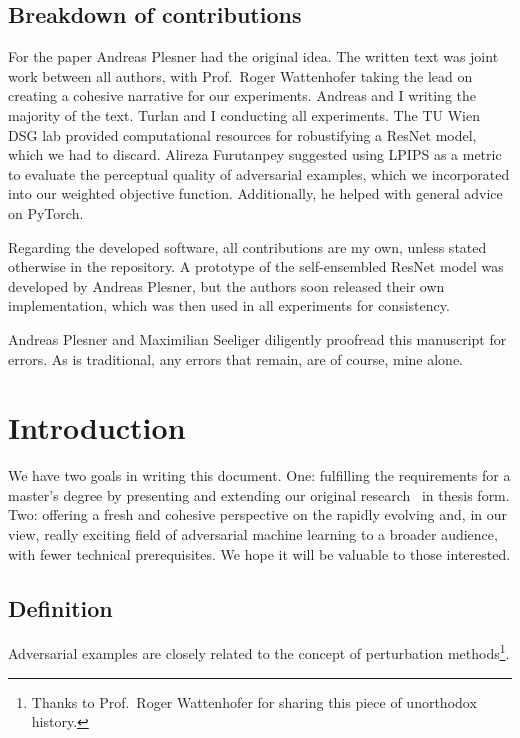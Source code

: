 \documentclass[a4paper, oneside]{discothesis}
\begin{document}
\section*{Breakdown of contributions}

For the paper Andreas Plesner had the original idea. The written text was joint work between all authors, with Prof.\ Roger Wattenhofer taking the lead on creating a cohesive narrative for our experiments. Andreas and I writing the majority of the text. Turlan and I conducting all experiments. The TU Wien DSG lab provided computational resources for robustifying a ResNet model, which we had to discard. Alireza Furutanpey suggested using LPIPS as a metric to evaluate the perceptual quality of adversarial examples, which we incorporated into our weighted objective function. Additionally, he helped with general advice on PyTorch.

Regarding the developed software, all contributions are my own, unless stated otherwise in the repository. A prototype of the self-ensembled ResNet model was developed by Andreas Plesner, but the authors soon released their own implementation, which was then used in all experiments for consistency.

Andreas Plesner and Maximilian Seeliger diligently proofread this manuscript for errors. As is traditional, any errors that remain, are of course, mine alone.

\tableofcontents

\mainmatter

% 
% 

\chapter{Introduction}

We have two goals in writing this document. One: fulfilling the requirements for a master's degree by presenting and extending our original research~\cite{jabary2024seeing} in thesis form. Two: offering a fresh and cohesive perspective on the rapidly evolving and, in our view, really exciting field of adversarial machine learning to a broader audience, with fewer technical prerequisites. We hope it will be valuable to those interested.

\section{Definition}

Adversarial examples are closely related to the concept of perturbation methods\footnote{Thanks to Prof.\ Roger Wattenhofer for sharing this piece of unorthodox history.}.
\end{document}
